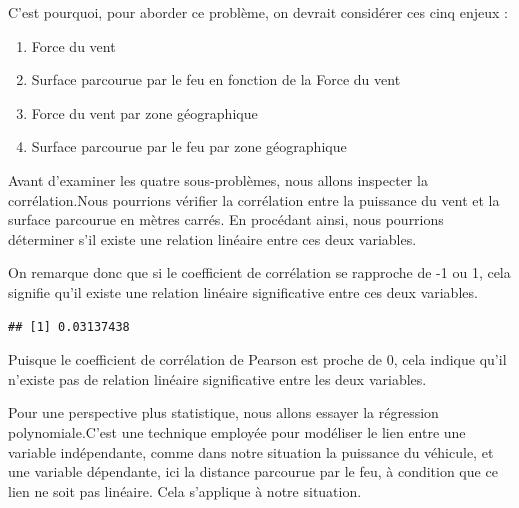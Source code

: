 \documentclass[
]{article}
\newenvironment{Shaded}{\begin{snugshade}}{\end{snugshade}}
\newcommand{\AttributeTok}[1]{\textcolor[rgb]{0.13,0.29,0.53}{#1}}
\newcommand{\FunctionTok}[1]{\textcolor[rgb]{0.13,0.29,0.53}{\textbf{#1}}}
\newcommand{\NormalTok}[1]{#1}
\newcommand{\OtherTok}[1]{\textcolor[rgb]{0.56,0.35,0.01}{#1}}
\newcommand{\SpecialCharTok}[1]{\textcolor[rgb]{0.81,0.36,0.00}{\textbf{#1}}}
\newcommand{\StringTok}[1]{\textcolor[rgb]{0.31,0.60,0.02}{#1}}
\providecommand{\tightlist}{%
  \setlength{\itemsep}{0pt}\setlength{\parskip}{0pt}}
\begin{document}
C'est pourquoi, pour aborder ce problème, on devrait considérer ces cinq
enjeux :

\begin{enumerate}
\def\labelenumi{\arabic{enumi}.}
\tightlist
\item
  Force du vent
\item
  Surface parcourue par le feu en fonction de la Force du vent
\item
  Force du vent par zone géographique
\item
  Surface parcourue par le feu par zone géographique
\end{enumerate}

Avant d'examiner les quatre sous-problèmes, nous allons inspecter la
corrélation.Nous pourrions vérifier la corrélation entre la puissance du
vent et la surface parcourue en mètres carrés. En procédant ainsi, nous
pourrions déterminer s'il existe une relation linéaire entre ces deux
variables.

On remarque donc que si le coefficient de corrélation se rapproche de -1
ou 1, cela signifie qu'il existe une relation linéaire significative
entre ces deux variables.

\begin{Shaded}
\end{Shaded}

\begin{verbatim}
## [1] 0.03137438
\end{verbatim}

Puisque le coefficient de corrélation de Pearson est proche de 0, cela
indique qu'il n'existe pas de relation linéaire significative entre les
deux variables.

Pour une perspective plus statistique, nous allons essayer la régression
polynomiale.C'est une technique employée pour modéliser le lien entre
une variable indépendante, comme dans notre situation la puissance du
véhicule, et une variable dépendante, ici la distance parcourue par le
feu, à condition que ce lien ne soit pas linéaire. Cela s'applique à
notre situation.
\end{document}
